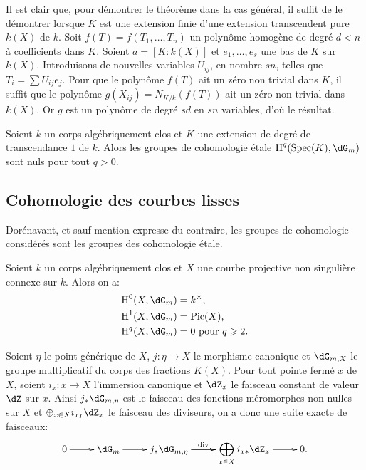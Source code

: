Il est clair que, pour démontrer le théorème dans la cas général, il 
suffit de le démontrer lorsque $K$ est une extension finie d'une extension 
transcendent pure $k(X)$ de $k$. Soit $f(T)=f(T_1,\dotsc,T_n)$ un 
polynôme homogène de degré $d<n$ à coefficients dans $K$. Soient 
$a=[K:k(X)]$ et $e_1,\dotsc,e_s$ une bas de $K$ sur $k(X)$. Introduisons de 
nouvelles variables $U_{i j}$, en nombre $s n$, telles que 
$T_i=\sum U_{i j}e_j$. Pour que le polynôme $f(T)$ ait un zéro 
non trivial dans $K$, il suffit que le polynôme 
$g(X_{i j}) = N_{K/k}(f( T))$ ait un zéro non trivial dans $k(X)$. 
Or $g$ est un polynôme de degré $s d$ en $s n$ variables, d'où le 
résultat. 





\begin{corollary}\label{I:3-2-4}
  Soient $k$ un corps algébriquement clos et $K$ une extension de degré 
de transcendance $1$ de $k$. Alors les groupes de cohomologie étale 
$\h^q(\spec(K),\dG_m)$ sont nuls pour tout $q>0$. 
\end{corollary}










\subsection{Cohomologie des courbes lisses}

Dorénavant, et sauf mention expresse du contraire, les groupes de 
cohomologie considérés sont les groupes des cohomologie étale. 





\begin{proposition}\label{I:3-3-1}
Soient $k$ un corps algébriquement clos et $X$ une courbe projective non 
singulière connexe sur $k$. Alors on a:
\begin{align*}
  \h^0(X,\dG_m) &= k^\times \text{,} \\
  \h^1(X,\dG_m) &= \pic(X) \text{,} \\
  \h^q(X,\dG_m) &= 0 \text{ pour $q\geqslant 2$.}
\end{align*}
\end{proposition}

Soient $\eta$ le point générique de $X$, $j:\eta\to X$ le morphisme 
canonique et $\dG_{m,X}$ le groupe multiplicatif du corps des fractions 
$K(X)$. Pour tout pointe fermé $x$ de $X$, soient $i_x:x\to X$ l'immersion 
canonique et $\dZ_x$ le faisceau constant de valeur $\dZ$ sur $x$. Ainsi 
$j_*\dG_{m,\eta}$ est le faisceau des fonctions méromorphes non nulles sur 
$X$ et $\oplus_{x\in X} i_{x_I}\dZ_x$ le faisceau des diviseurs, on a donc une 
suite exacte de faisceaux:
\begin{equation}\label{I:eq:3-3-1-1}
\xymatrix{
  0 \ar[r] 
    & \dG_m \ar[r]
    & j_* \dG_{m,\eta} \ar[r]^-{\dv} \ar[r] 
    & \displaystyle\bigoplus_{x\in X} i_{x*} \dZ_x \ar[r] 
    & 0\text{.}
}
\end{equation}





